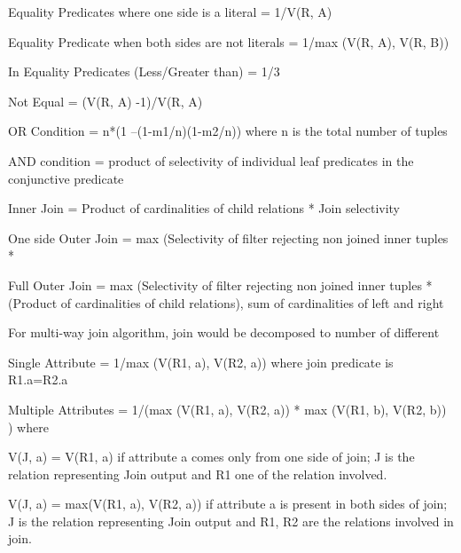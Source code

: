 \documentclass{vldb}
\newcommand{\ii}{\item}
\begin{document}
\ii Equality Predicates where one side is a literal = 1/V(R, A)
\ii Equality Predicate when both sides are not literals = 1/max (V(R, A), V(R, B))
\ii In Equality Predicates (Less/Greater than) = 1/3
\ii Not Equal = (V(R, A) -1)/V(R, A)
\ii OR Condition = n*(1 –(1-m1/n)(1-m2/n)) where n is the total number of tuples
\ii AND condition = product of selectivity of individual leaf predicates in the conjunctive predicate
\ii Inner Join = Product of cardinalities of child relations * Join selectivity
\ii One side Outer Join = max (Selectivity of filter rejecting non joined inner tuples *
\ii Full Outer Join = max (Selectivity of filter rejecting non joined inner tuples * (Product of cardinalities of child relations), sum of cardinalities of left and right
\ii For multi-way join algorithm, join would be decomposed to number of different
\ii Single Attribute = 1/max (V(R1, a), V(R2, a)) where join predicate is R1.a=R2.a
\ii Multiple Attributes = 1/(max (V(R1, a), V(R2, a)) * max (V(R1, b), V(R2, b)) ) where
\ii V(J, a) = V(R1, a) if attribute a comes only from one side of join; J is the relation representing Join output and R1 one of the relation involved.
\ii V(J, a) = max(V(R1, a), V(R2, a)) if attribute a is present in both sides of join; J is the relation representing Join output and R1, R2 are the relations involved in join.
\end{document}
